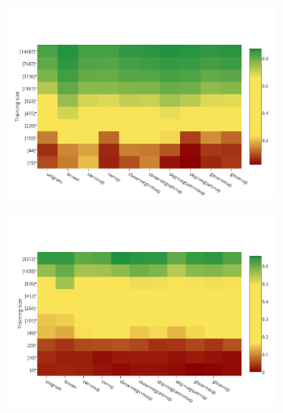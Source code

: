 \begin{figure}
\begin{subfigure}{7cm}
	\centering
    \includegraphics[scale=0.4]{plots/map-ner-color-invert}    	
\end{subfigure}
\begin{subfigure}{7cm}
	\centering
    \includegraphics[scale=0.4]{plots/map-mwe-color-invert}
\end{subfigure}
\label{fig:bestPOS-Chunk}
\end{figure}


